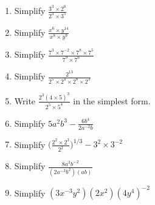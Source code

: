 \documentclass[16pt]{article}
\theoremstyle{remark}
\begin{document}
\begin{enumerate}
\item Simplify $\displaystyle{\frac{3^3 \times 2^6}{2^3\times 3^5}}$
\vspace{5cm}
\item Simplify $\displaystyle{\frac{x^{6} \times y^{14}}{x^8 \times y^9}}$
\vspace{5cm}
\item Simplify $\displaystyle{\frac{7^3 \times 7^{-2} \times 7^8 \times 7^5}{7^9 \times 7^6}}$
\vspace{5cm}
\item Simplify $\displaystyle{\frac{2^{13}}{2^5\times 2^4 \times 2^8 \times 2^3}}$
\vspace{5cm}
\newpage



\item Write $\displaystyle{\frac{2^3 (4\times 5)^3}{2^5 \times5^4}}$ in the simplest form.
\vspace{5cm}
\item Simplify $\displaystyle{5a^2b^3-\frac{6b^4}{2a^{-2}b}}$
\vspace{5cm}
\item Simplify $\displaystyle{\bigg(\frac{2^2 \times 2^3}{2^2}\bigg)^{1/3} - 3^2\times 3^{-2}}$
\vspace{5cm}

\item Simplify $\displaystyle{\frac{8a^3b^{-2}}{(2a^{-3}b^2)(ab)}}$
\vspace{5cm}
\item Simplify $\displaystyle{(3x^{-3}y^2)(2x^2)(4y^4)^{-2}}$
\vspace{5cm}

\end{enumerate}
\end{document}
